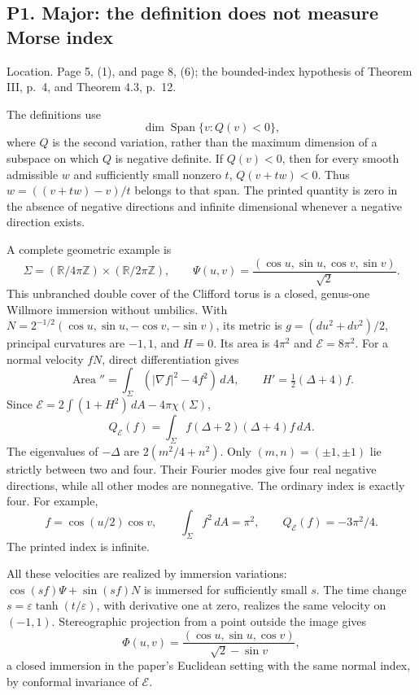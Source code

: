 \documentclass[10pt]{article}
\begin{document}
\subsection*{P1. Major: the definition does not measure Morse index}
Location. Page 5, (1), and page 8, (6); the bounded-index hypothesis of Theorem III, p. 4, and Theorem 4.3, p. 12.\par
The definitions use \[\dim\operatorname{Span}\{v:Q(v)<0\},\] where \(Q\) is the second variation, rather than the maximum dimension of a subspace on which \(Q\) is negative definite. If \(Q(v)<0\), then for every smooth admissible \(w\) and sufficiently small nonzero \(t\), \(Q(v+tw)<0\). Thus \(w=((v+tw)-v)/t\) belongs to that span. The printed quantity is zero in the absence of negative directions and infinite dimensional whenever a negative direction exists.\par
A complete geometric example is \[\Sigma=(\mathbb R/4\pi\mathbb Z)\times(\mathbb R/2\pi\mathbb Z),\qquad
 \Psi(u,v)=\frac{(\cos u,\sin u,\cos v,\sin v)}{\sqrt2}.\] This unbranched double cover of the Clifford torus is a closed, genus-one Willmore immersion without umbilics. With \(N=2^{-1/2}(\cos u,\sin u,-\cos v,-\sin v)\), its metric is \(g=(du^2+dv^2)/2\), principal curvatures are \(-1,1\), and \(H=0\). Its area is \(4\pi^2\) and \(\mathcal E=8\pi^2\). For a normal velocity \(fN\), direct differentiation gives \[\operatorname{Area}''=\int_\Sigma(|\nabla f|^2-4f^2)\,dA,\qquad
 H'=\tfrac12(\Delta+4)f.\] Since \(\mathcal E=2\int(1+H^2)\,dA-4\pi\chi(\Sigma)\), \[Q_\mathcal E(f)=\int_\Sigma f(\Delta+2)(\Delta+4)f\,dA.
 \tag{P1.1}\] The eigenvalues of \(-\Delta\) are \(2(m^2/4+n^2)\). Only \((m,n)=(\pm1,\pm1)\) lie strictly between two and four. Their Fourier modes give four real negative directions, while all other modes are nonnegative. The ordinary index is exactly four. For example, \[f=\cos(u/2)\cos v,\qquad
 \int_\Sigma f^2\,dA=\pi^2,\qquad Q_\mathcal E(f)=-3\pi^2/4.\] The printed index is infinite.\par
All these velocities are realized by immersion variations: \(\cos(sf)\Psi+\sin(sf)N\) is immersed for sufficiently small \(s\). The time change \(s=\varepsilon\tanh(t/\varepsilon)\), with derivative one at zero, realizes the same velocity on \((-1,1)\). Stereographic projection from a point outside the image gives \[\Phi(u,v)=\frac{(\cos u,\sin u,\cos v)}{\sqrt2-\sin v},\] a closed immersion in the paper’s Euclidean setting with the same normal index, by conformal invariance of \(\mathcal E\).\par
\end{document}
